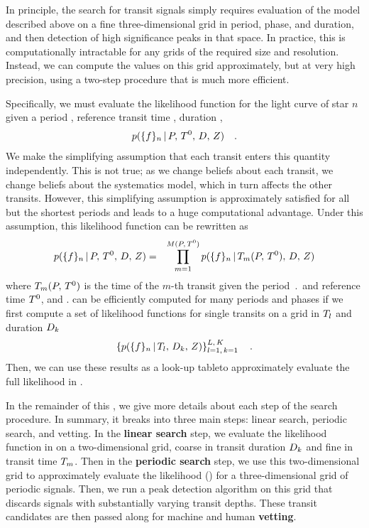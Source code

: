 In principle, the search for transit signals simply requires evaluation of the
model described above on a fine three-dimensional grid in period, phase, and
duration, and then detection of high significance peaks in that space.
In practice, this is computationally intractable for any grids of the
required size and resolution.
Instead, we can compute the values on this grid approximately, but at very
high precision, using a two-step procedure that is much more efficient.

Specifically, we must evaluate the likelihood function for the light curve of
star $n$ given a period \period, reference transit time \phase, duration
\duration, 
\begin{eqnarray}\eqlabel{full-likelihood}
p(\{\flux\}_n\,|\,\period,\,\phase,\,\duration,\,\depth) \quad.
\end{eqnarray}
We make the simplifying assumption that each transit enters this quantity
independently.
This is not true; as we change beliefs about each transit, we change beliefs
about the systematics model, which in turn affects the other transits.
However, this simplifying assumption
is approximately satisfied for all but the shortest
periods and leads to a huge computational advantage.
Under this assumption, this likelihood function can be rewritten as
\begin{eqnarray}\eqlabel{indtran}
p(\{\flux\}_n\,|\,\period,\,\phase,\,\duration,\,\depth) &=&
\prod_{m=1}^{M(\period,\,\phase)}
    p(\{\flux\}_n\,|\,\transittime_m(\period,\,\phase),\,\duration,\,
                    \depth)
\end{eqnarray}
where ${T}_m({P},\,{T^0})$ is the time of the $m$-th
transit given the period $\period$ and reference time ${T^0}$, and
.
 can be efficiently computed for many periods and phases if we
first compute a set of likelihood functions for single transits on a grid
in ${T}_l$ and duration ${D}_k$
\begin{eqnarray}\eqlabel{singletransit}
\left \{ p(\{\flux\}_n\,|\,\transittime_l,\,\duration_k,\,\depth)
\right\}_{l=1,\,k=1}^{L,\,K} \quad.
\end{eqnarray}
Then, we can use these results as a look-up tableto approximately evaluate the full
likelihood in .

In the remainder of this \sectionname, we give more details about each step of
the search procedure.
In summary, it breaks into three main steps: linear
search, periodic search, and vetting.
In the {\bf linear search} step, we evaluate the likelihood function in
 on a two-dimensional grid, coarse in transit duration
${D}_k$ and fine in transit time ${T}_m$.
Then in the {\bf periodic search} step, we use this two-dimensional grid to
approximately evaluate the likelihood () for a
three-dimensional grid of periodic signals.
Then, we run a peak detection algorithm on this grid that discards signals
with substantially varying transit depths.
These transit candidates are then passed along for machine and human {\bf
vetting}.


